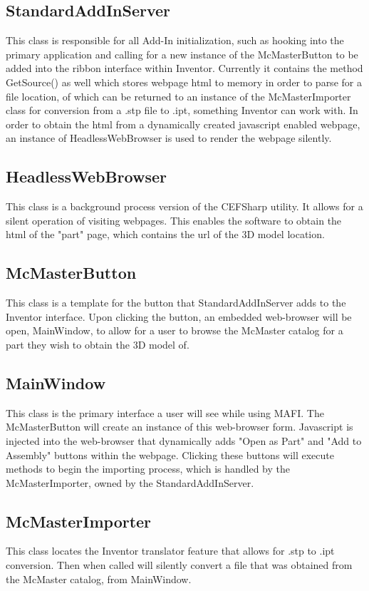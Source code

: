 \documentclass[12pt, letterpaper]{article}
\begin{document}
\subsection{StandardAddInServer}
This class is responsible for all Add-In initialization, such as hooking into the primary application 
and calling for a new instance of the McMasterButton to be added into
the ribbon interface within Inventor. Currently it contains the method GetSource() as well which 
stores webpage html to memory in order to parse for a file location, of which can be returned to an instance of 
the McMasterImporter class for conversion from a .stp file to .ipt, something Inventor can work with. In 
order to obtain the html from a dynamically created javascript enabled webpage, an instance of HeadlessWebBrowser is
used to render the webpage silently.
\subsection{HeadlessWebBrowser}
This class is a background process version of the CEFSharp utility. It allows for a silent operation of visiting 
webpages. This enables the software to obtain the html of the "part" page, which contains the url of the 3D model 
location.
\subsection{McMasterButton}
This class is a template for the button that StandardAddInServer adds to the Inventor interface. Upon 
clicking the button, an embedded web-browser will be open, MainWindow, to allow for a user to browse 
the McMaster catalog for a part they wish to obtain the 3D model of.
\subsection{MainWindow}
This class is the primary interface a user will see while using MAFI. The McMasterButton will create an 
instance of this web-browser form. Javascript is injected into the web-browser that dynamically adds "Open 
as Part" and "Add to Assembly" buttons within the webpage. Clicking these buttons will execute methods to begin 
the importing process, which is handled by the McMasterImporter, owned by the StandardAddInServer.
\subsection{McMasterImporter}
This class locates the Inventor translator feature that allows for .stp to .ipt conversion. Then when called 
will silently convert a file that was obtained from the McMaster catalog, from MainWindow.
\end{document}
